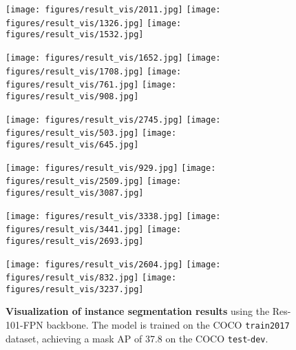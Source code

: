 \documentclass[runningheads]{llncs}
\begin{document}
\begin{figure*}[ht]
\centering 
{


\def\visimgheighta{2.7cm}
\texttt{[image: figures/result\_vis/2011.jpg]}
\texttt{[image: figures/result\_vis/1326.jpg]}
\texttt{[image: figures/result\_vis/1532.jpg]}

\def\visimgheightb{2.67cm}
\texttt{[image: figures/result\_vis/1652.jpg]}
\texttt{[image: figures/result\_vis/1708.jpg]}
\texttt{[image: figures/result\_vis/761.jpg]}
\texttt{[image: figures/result\_vis/908.jpg]}

\def\visimgheightc{2.57cm}
\texttt{[image: figures/result\_vis/2745.jpg]}
\texttt{[image: figures/result\_vis/503.jpg]}
\texttt{[image: figures/result\_vis/645.jpg]}

\def\visimgheightd{2.72cm}
\texttt{[image: figures/result\_vis/929.jpg]}
\texttt{[image: figures/result\_vis/2509.jpg]}
\texttt{[image: figures/result\_vis/3087.jpg]}


\def\visimgheighte{2.56cm}
\texttt{[image: figures/result\_vis/3338.jpg]}
\texttt{[image: figures/result\_vis/3441.jpg]}
\texttt{[image: figures/result\_vis/2693.jpg]}

\def\visimgheightf{2.65cm}
\texttt{[image: figures/result\_vis/2604.jpg]}
\texttt{[image: figures/result\_vis/832.jpg]}
\texttt{[image: figures/result\_vis/3237.jpg]}




} \caption{\textbf{Visualization of instance segmentation results}
using the Res-101-FPN backbone.
The model is trained on the COCO \texttt{train2017} dataset, achieving a mask AP of 37.8 on the COCO \texttt{test}-\texttt{dev}.
}
\label{fig:Vis}
\end{figure*}



 
\end{document}
